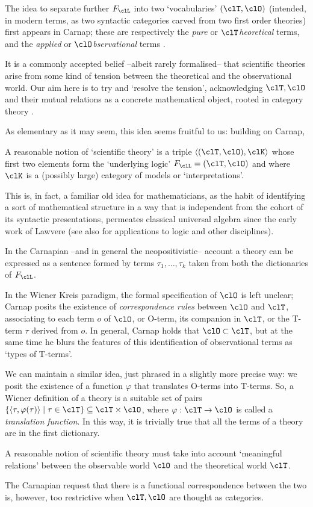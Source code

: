 The idea to separate further $F_\clL$ into two `vocabularies' $(\clT,\clO)$ (intended, in modern terms, as two syntactic categories carved from two first order theories) first appears in Carnap; these are respectively the \emph{pure} or $\clT$\emph{heoretical} terms, and the \emph{applied} or $\clO$\emph{bservational} terms \cite{carnap56}.

It is a commonly accepted belief --albeit rarely formalised-- that scientific theories arise from some kind of tension between the theoretical and the observational world. Our aim here is to try and `resolve the tension', acknowledging $\clT,\clO$ and their mutual relations as a concrete mathematical object, rooted in category theory \cite{working-categories,pedicchiofoundations,riehlcontext,leinster2014basic}.

As elementary as it may seem, this idea seems fruitful to us: building on Carnap,
\begin{remark*}
  A reasonable notion of `scientific theory' is a triple $\bk{(\clT,\clO), \clK}$ whose first two elements form the `underlying logic' $F_\clL=(\clT,\clO)$ and where $\clK$ is a (possibly large) category of models or `interpretations'.
\end{remark*}
This is, in fact, a familiar old idea for mathematicians, as the habit of identifying a sort of mathematical structure in a way that is independent from the cohort of its syntactic presentations, permeates classical universal algebra since the early work of Lawvere \cite{lawvere1963functorial,lawvere1996unity} (see also \cite{abramskyno,Borceux1994,makkai1989accessible} for applications to logic and other disciplines).

In the Carnapian --and in general the neopositivistic-- account a theory can be expressed as a sentence formed by terms $\tau_1, \dots, \tau_k$ taken from both the dictionaries of $F_\clL$.

In the Wiener Kreis paradigm, the formal specification of $\clO$ is left unclear; Carnap \cite{carnapfound} posits the existence of \emph{correspondence rules} between $\clO$ and $\clT$, associating to each term $o$ of $\clO$, or O-term, its companion in $\clT$, or the T-term $\tau$ derived from $o$. In general, Carnap holds that $\clO \subset \clT$, but at the same time he blurs the features of this identification of observational terms as `types of T-terms'.

We can maintain a similar idea, just phrased in a slightly more precise way: we posit the existence of a function $\varphi$ that translates O-terms into T-terms. So, a Wiener definition of a theory is a suitable set of pairs $\{\bk{\tau,\varphi(\tau)} \mid \tau\in\clT\}\subseteq \clT\times\clO$, where $\varphi: \clT \to \clO$ is called a \emph{translation function}. In this way, it is trivially true that all the terms of a theory are in the first dictionary.
\begin{remark*}
  A reasonable notion of scientific theory must take into account `meaningful relations' between the observable world $\clO$ and the theoretical world $\clT$. 
\end{remark*}
The Carnapian request that there is a functional correspondence between the two is, however, too restrictive when $\clT,\clO$ are thought as categories.

